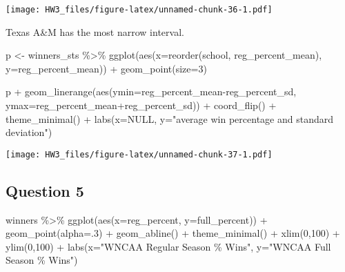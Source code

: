 \documentclass[
]{article}
\newenvironment{Shaded}{\begin{snugshade}}{\end{snugshade}}
\newcommand{\AttributeTok}[1]{\textcolor[rgb]{0.77,0.63,0.00}{#1}}
\newcommand{\ConstantTok}[1]{\textcolor[rgb]{0.00,0.00,0.00}{#1}}
\newcommand{\DecValTok}[1]{\textcolor[rgb]{0.00,0.00,0.81}{#1}}
\newcommand{\FunctionTok}[1]{\textcolor[rgb]{0.00,0.00,0.00}{#1}}
\newcommand{\NormalTok}[1]{#1}
\newcommand{\OtherTok}[1]{\textcolor[rgb]{0.56,0.35,0.01}{#1}}
\newcommand{\SpecialCharTok}[1]{\textcolor[rgb]{0.00,0.00,0.00}{#1}}
\newcommand{\StringTok}[1]{\textcolor[rgb]{0.31,0.60,0.02}{#1}}
\begin{document}
\texttt{[image: HW3\_files/figure-latex/unnamed-chunk-36-1.pdf]}

Texas A\&M has the most narrow interval.

\begin{Shaded}
\begin{Highlighting}[]
\NormalTok{p }\OtherTok{\textless{}{-}}\NormalTok{ winners\_sts }\SpecialCharTok{\%\textgreater{}\%} 
  \FunctionTok{ggplot}\NormalTok{(}\FunctionTok{aes}\NormalTok{(}\AttributeTok{x=}\FunctionTok{reorder}\NormalTok{(school, reg\_percent\_mean),}
             \AttributeTok{y=}\NormalTok{reg\_percent\_mean)) }\SpecialCharTok{+}
  \FunctionTok{geom\_point}\NormalTok{(}\AttributeTok{size=}\DecValTok{3}\NormalTok{)}

\NormalTok{p }\SpecialCharTok{+} \FunctionTok{geom\_linerange}\NormalTok{(}\FunctionTok{aes}\NormalTok{(}\AttributeTok{ymin=}\NormalTok{reg\_percent\_mean}\SpecialCharTok{{-}}\NormalTok{reg\_percent\_sd,}
                      \AttributeTok{ymax=}\NormalTok{reg\_percent\_mean}\SpecialCharTok{+}\NormalTok{reg\_percent\_sd)) }\SpecialCharTok{+}
  \FunctionTok{coord\_flip}\NormalTok{() }\SpecialCharTok{+}
  \FunctionTok{theme\_minimal}\NormalTok{() }\SpecialCharTok{+}
  \FunctionTok{labs}\NormalTok{(}\AttributeTok{x=}\ConstantTok{NULL}\NormalTok{, }
       \AttributeTok{y=}\StringTok{"average win percentage and standard deviation"}\NormalTok{)}
\end{Highlighting}
\end{Shaded}

\texttt{[image: HW3\_files/figure-latex/unnamed-chunk-37-1.pdf]}

\hypertarget{question-5-2}{%
\subsection{Question 5}\label{question-5-2}}

\begin{Shaded}
\begin{Highlighting}[]
\NormalTok{winners }\SpecialCharTok{\%\textgreater{}\%} \FunctionTok{ggplot}\NormalTok{(}\FunctionTok{aes}\NormalTok{(}\AttributeTok{x=}\NormalTok{reg\_percent,}
                   \AttributeTok{y=}\NormalTok{full\_percent)) }\SpecialCharTok{+}
  \FunctionTok{geom\_point}\NormalTok{(}\AttributeTok{alpha=}\NormalTok{.}\DecValTok{3}\NormalTok{) }\SpecialCharTok{+}
  \FunctionTok{geom\_abline}\NormalTok{() }\SpecialCharTok{+}
  \FunctionTok{theme\_minimal}\NormalTok{() }\SpecialCharTok{+}
  \FunctionTok{xlim}\NormalTok{(}\DecValTok{0}\NormalTok{,}\DecValTok{100}\NormalTok{) }\SpecialCharTok{+}
  \FunctionTok{ylim}\NormalTok{(}\DecValTok{0}\NormalTok{,}\DecValTok{100}\NormalTok{) }\SpecialCharTok{+}
  \FunctionTok{labs}\NormalTok{(}\AttributeTok{x=}\StringTok{"WNCAA Regular Season \% Wins"}\NormalTok{, }
       \AttributeTok{y=}\StringTok{"WNCAA Full Season \% Wins"}\NormalTok{)}
\end{Highlighting}
\end{Shaded}
\end{document}
